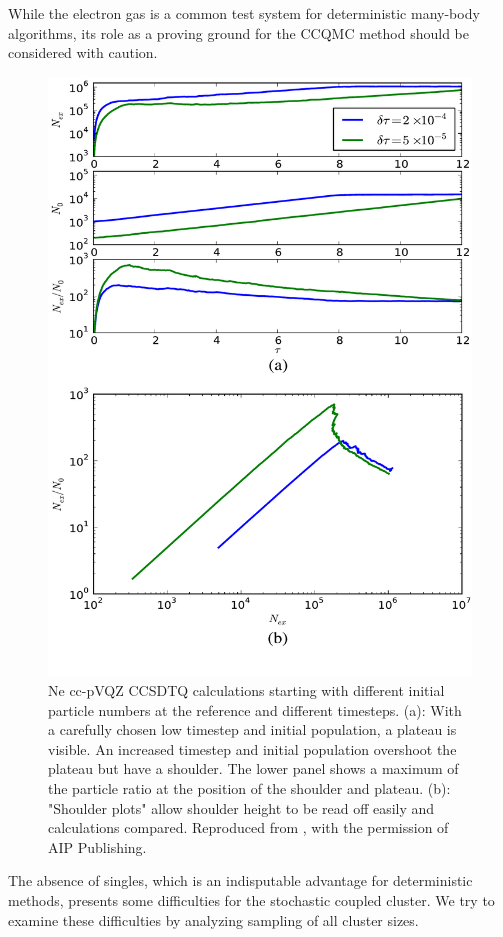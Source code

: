 \documentclass[twoside,english]{uiofysmaster}
\begin{document}
While the electron gas is a common test system for deterministic many-body algorithms, its role as a proving ground for the CCQMC method should be considered with caution.
\begin{figure}[ht!]
	\centering
	\includegraphics[width=0.8\linewidth]{thomEG}
	\caption{Ne cc-pVQZ CCSDTQ calculations starting with different initial
		particle numbers at the reference and different timesteps. (a): With a carefully
		chosen low timestep and initial population, a plateau is visible. An increased
		timestep and initial population overshoot the plateau but have a shoulder.
		The lower panel shows a maximum of the particle ratio at the position of
		the shoulder and plateau. (b): "Shoulder plots" allow shoulder height to be
		read off easily and calculations compared. Reproduced from \cite{SpencerDevelopmentsstochasticcoupled2016}, with the permission of AIP Publishing. }
	\label{fig:thomEG}
\end{figure}



The absence of singles, which is an indisputable advantage for deterministic methods, presents some difficulties for the stochastic coupled cluster. We try to examine these difficulties by analyzing sampling of all cluster sizes.
\end{document}
